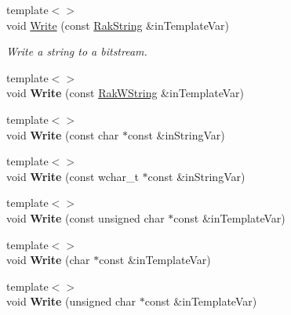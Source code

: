 \begin{DoxyCompactItemize}
\item 
{\footnotesize template$<$$>$ }\\void \hyperlink{class_rak_net_1_1_bit_stream_ab0c45b04dff683e04916b8da25de8154}{Write} (const \hyperlink{class_rak_net_1_1_rak_string}{Rak\-String} \&in\-Template\-Var)
\begin{DoxyCompactList}\small\item\em Write a string to a bitstream. \end{DoxyCompactList}\item 
\hypertarget{class_rak_net_1_1_bit_stream_af393b277c9e27e8504b69c7120f549ec}{{\footnotesize template$<$$>$ }\\void {\bfseries Write} (const \hyperlink{class_rak_net_1_1_rak_w_string}{Rak\-W\-String} \&in\-Template\-Var)}\label{class_rak_net_1_1_bit_stream_af393b277c9e27e8504b69c7120f549ec}

\item 
\hypertarget{class_rak_net_1_1_bit_stream_ad13989de75cf6ad192cdc8bc57f254e3}{{\footnotesize template$<$$>$ }\\void {\bfseries Write} (const char $\ast$const \&in\-String\-Var)}\label{class_rak_net_1_1_bit_stream_ad13989de75cf6ad192cdc8bc57f254e3}

\item 
\hypertarget{class_rak_net_1_1_bit_stream_a4f05bb441dfb7c8980d359a61242753b}{{\footnotesize template$<$$>$ }\\void {\bfseries Write} (const wchar\-\_\-t $\ast$const \&in\-String\-Var)}\label{class_rak_net_1_1_bit_stream_a4f05bb441dfb7c8980d359a61242753b}

\item 
\hypertarget{class_rak_net_1_1_bit_stream_a4af4e4f0c5c4dd9f4eb058550f390627}{{\footnotesize template$<$$>$ }\\void {\bfseries Write} (const unsigned char $\ast$const \&in\-Template\-Var)}\label{class_rak_net_1_1_bit_stream_a4af4e4f0c5c4dd9f4eb058550f390627}

\item 
\hypertarget{class_rak_net_1_1_bit_stream_a001d8f8b4b6ff60bd6a401cb7d98f662}{{\footnotesize template$<$$>$ }\\void {\bfseries Write} (char $\ast$const \&in\-Template\-Var)}\label{class_rak_net_1_1_bit_stream_a001d8f8b4b6ff60bd6a401cb7d98f662}

\item 
\hypertarget{class_rak_net_1_1_bit_stream_a79c2fff840265940671ada95aaccb9e5}{{\footnotesize template$<$$>$ }\\void {\bfseries Write} (unsigned char $\ast$const \&in\-Template\-Var)}\label{class_rak_net_1_1_bit_stream_a79c2fff840265940671ada95aaccb9e5}


\end{DoxyCompactItemize}
